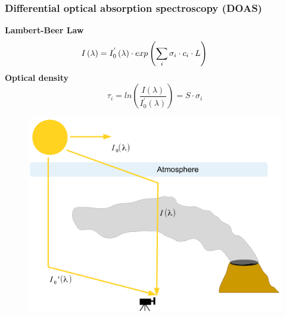 \documentclass{beamer} %
\begin{document}
	
	\begin{frame}
		\frametitle{\color{mygreen}Differential optical absorption spectroscopy (DOAS)\\%
		\color{mygreen}{\rule{0.8\textwidth}{2pt}}}

	\vspace{-1cm}
	\begin{block}{}
		\begin{multicols}{2}
			\textbf{Lambert-Beer Law} \\
			\vspace{-0.5cm}
			\begin{equation*}
			\hspace*{-0.9cm}I\left(\lambda \right) = I^{'}_{0}\left(\lambda\right)\cdot exp\left(\sum_{i}\sigma_{i}\cdot c_{i}\cdot L \right)
			\end{equation*}
			\textbf{Optical density}
			\vspace{-0.5cm}
			\begin{equation*}
			\tau_{i} = ln\left(\frac{I(\lambda)}{I^{'}_{0}\left(\lambda\right)}\right) = S\cdot\sigma_{i}
			\end{equation*}
		\end{multicols}	
	\end{block}
	\begin{multicols}{2}
		\begin{figure}
			\centering
			\includegraphics[width=1\linewidth]{../../Bilder/DOASFunction}
			\label{fig:doasfunction}
		\end{figure}
	\begin{figure}

\end{figure}
\end{multicols}
\end{frame}
\end{document}
